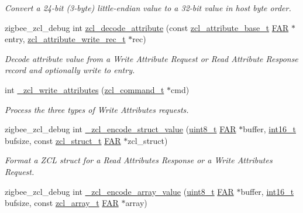 \begin{DoxyCompactItemize}
\begin{DoxyCompactList}\small\item\em Convert a 24-\/bit (3-\/byte) little-\/endian value to a 32-\/bit value in host byte order. \end{DoxyCompactList}\item 
zigbee\+\_\+zcl\+\_\+debug int \hyperlink{group__zcl_ga15bf36dadccd7a045bad7d6f0842e25a}{zcl\+\_\+decode\+\_\+attribute} (const \hyperlink{structzcl__attribute__base__t}{zcl\+\_\+attribute\+\_\+base\+\_\+t} \hyperlink{group__hal_gaef060b3456fdcc093a7210a762d5f2ed}{F\+AR} $\ast$entry, \hyperlink{structzcl__attribute__write__rec__t}{zcl\+\_\+attribute\+\_\+write\+\_\+rec\+\_\+t} $\ast$rec)
\begin{DoxyCompactList}\small\item\em Decode attribute value from a Write Attribute Request or Read Attribute Response record and optionally write to {\ttfamily entry}. \end{DoxyCompactList}\item 
int \hyperlink{group__zcl_gaff3abb5d2022101c2873e7a8e8b027e5}{\+\_\+zcl\+\_\+write\+\_\+attributes} (\hyperlink{structzcl__command__t}{zcl\+\_\+command\+\_\+t} $\ast$cmd)
\begin{DoxyCompactList}\small\item\em Process the three types of Write Attributes requests. \end{DoxyCompactList}\item 
zigbee\+\_\+zcl\+\_\+debug int \hyperlink{group__zcl_ga4387e5f016fb26d1ac43b24f78aa066a}{\+\_\+zcl\+\_\+encode\+\_\+struct\+\_\+value} (\hyperlink{group__hal__dos_gae1affc9ca37cfb624959c866a73f83c2}{uint8\+\_\+t} \hyperlink{group__hal_gaef060b3456fdcc093a7210a762d5f2ed}{F\+AR} $\ast$buffer, \hyperlink{group__hal__dos_ga2140805d08462d474b82ddc8d1c2f3e6}{int16\+\_\+t} bufsize, const \hyperlink{structzcl__struct__t}{zcl\+\_\+struct\+\_\+t} \hyperlink{group__hal_gaef060b3456fdcc093a7210a762d5f2ed}{F\+AR} $\ast$zcl\+\_\+struct)
\begin{DoxyCompactList}\small\item\em Format a Z\+CL struct for a Read Attributes Response or a Write Attributes Request. \end{DoxyCompactList}\item 
zigbee\+\_\+zcl\+\_\+debug int \hyperlink{group__zcl_gaae79107724236347a5e22612869df2bf}{\+\_\+zcl\+\_\+encode\+\_\+array\+\_\+value} (\hyperlink{group__hal__dos_gae1affc9ca37cfb624959c866a73f83c2}{uint8\+\_\+t} \hyperlink{group__hal_gaef060b3456fdcc093a7210a762d5f2ed}{F\+AR} $\ast$buffer, \hyperlink{group__hal__dos_ga2140805d08462d474b82ddc8d1c2f3e6}{int16\+\_\+t} bufsize, const \hyperlink{structzcl__array__t}{zcl\+\_\+array\+\_\+t} \hyperlink{group__hal_gaef060b3456fdcc093a7210a762d5f2ed}{F\+AR} $\ast$array)

\end{DoxyCompactItemize}
